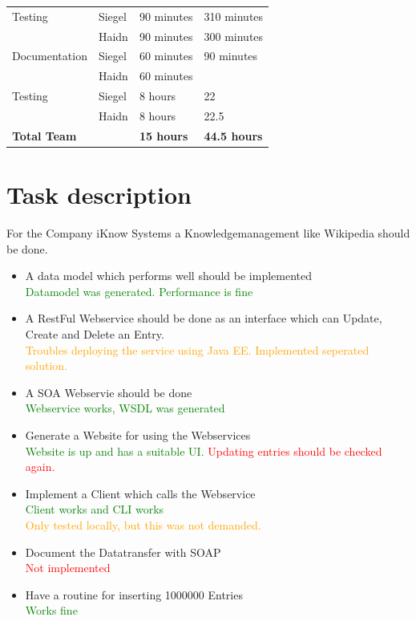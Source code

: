 \documentclass[12pt]{article}
\begin{document}
\begin{table}[h]
\begin{tabular}{|p{}|p{}|p{}|p{}|}
Testing & Siegel &  90  minutes  &  310  minutes  \\  
  & Haidn &  90  minutes  & 300  minutes   \\ \hline 


Documentation  & Siegel &  60 minutes  &  90 minutes  \\  
  & Haidn &  60  minutes  &    \\ \hline 

\hline 

Testing & Siegel &  8 hours  & 22   \\  
  & Haidn &  8 hours   & 22.5   \\ \hline 


 \hline 
\textbf{Total Team} & & \textbf{15 hours} &\textbf{44.5 hours}  \\ \hline 
\end{tabular}
\end{table}

\section{Task description}
For the Company iKnow Systems a Knowledgemanagement like Wikipedia should be done.
\begin{itemize}
\item A data model which performs well should be implemented\\
\textcolor{green}{Datamodel was generated. Performance is fine}
\item A RestFul Webservice should be done as an interface which can Update, Create and Delete an Entry.\\
\textcolor{orange}{Troubles deploying the service using Java EE. Implemented seperated solution.}
\item A SOA Webservie should be done\\
\textcolor{green}{Webservice works, WSDL was generated} \\
\item Generate a Website for using the Webservices\\
\textcolor{green}{Website is up and has a suitable UI.}
\textcolor{red}{Updating entries should be checked again.}
\item Implement a Client which calls the Webservice\\
\textcolor{green}{Client works and CLI works} \\
\textcolor{orange}{Only tested locally, but this was not demanded.}
\item Document the Datatransfer with SOAP\\
\textcolor{red}{Not implemented}
\item Have a routine for inserting 1000000 Entries \\
\textcolor{green}{Works fine} \\
\end{itemize}
\end{document}
